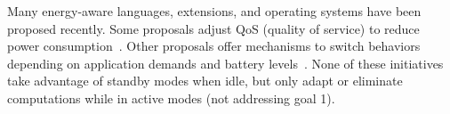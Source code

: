 \documentclass[12pt,english]{amsart}
\begin{document}
Many energy-aware languages, extensions, and operating systems have been
proposed recently.
%
Some proposals adjust QoS (quality of service) to reduce power consumption~\cite{os.ecosystem,lang.green,lang.enerj,lang.greenweb}.
%
Other proposals offer mechanisms to switch behaviors depending on application
demands and battery levels~\cite{lang.eon,lang.energytypes,lang.gradual,lang.ent}.
%
None of these initiatives take advantage of standby modes
when idle,
but only adapt or eliminate computations while in active modes (not
addressing goal 1).
%
%
%
\end{document}
